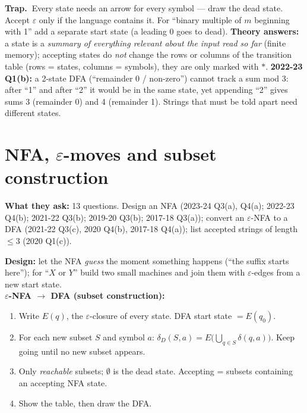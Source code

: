 \documentclass[10.5pt,a4paper]{article}
\newcommand{\TRAP}{\textbf{\color{trapborder}Trap.\ }}
\newcommand{\asked}[1]{{\small\color{gray!60!black}\textbf{What they ask:} #1}\par}
\newcommand{\eps}{\varepsilon}
\begin{document}
\begin{trap}\TRAP Every state needs an arrow for every symbol --- draw the dead state. Accept $\eps$ only if the language contains it.
For ``binary multiple of $m$ beginning with 1'' add a separate start state (a leading 0 goes to dead).
\textbf{Theory answers:} a state is a \emph{summary of everything relevant about the input read so far} (finite memory); accepting states do
\emph{not} change the rows or columns of the transition table (rows = states, columns = symbols), they are only marked with $*$.
\textbf{2022-23 Q1(b):} a 2-state DFA (``remainder 0 / non-zero'') cannot track a sum mod 3: after ``1'' and after ``2'' it would be in the
same state, yet appending ``2'' gives sums 3 (remainder 0) and 4 (remainder 1). Strings that must be told apart need different states.\end{trap}

\section{NFA, $\varepsilon$-moves and subset construction}
\asked{13 questions. Design an NFA (2023-24 Q3(a), Q4(a); 2022-23 Q4(b); 2021-22 Q3(b); 2019-20 Q3(b); 2017-18 Q3(a)); convert an $\eps$-NFA
to a DFA (2021-22 Q3(c), 2020 Q4(b), 2017-18 Q4(a)); list accepted strings of length $\le3$ (2020 Q1(c)).}
\begin{recipe}
\textbf{Design:} let the NFA \emph{guess} the moment something happens (``the suffix starts here''); for ``$X$ or $Y$'' build two small
machines and join them with $\eps$-edges from a new start state.\\
\textbf{$\eps$-NFA $\to$ DFA (subset construction):}
\begin{enumerate}
\item Write $E(q)$, the $\eps$-closure of every state. DFA start state $=E(q_0)$.
\item For each new subset $S$ and symbol $a$: $\delta_D(S,a)=E\big(\bigcup_{q\in S}\delta(q,a)\big)$. Keep going until no new subset appears.
\item Only \emph{reachable} subsets; $\emptyset$ is the dead state. Accepting = subsets containing an accepting NFA state.
\item Show the table, then draw the DFA.
\end{enumerate}
\end{recipe}
\end{document}
